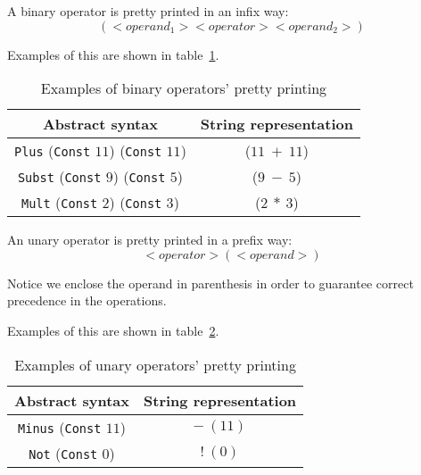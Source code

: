 A binary operator is pretty printed in an infix way:
\begin{equation*}
(<operand_1> <operator> <operand_2>)
\end{equation*}

Examples of this are shown in table~\ref{tab:pretty_bin_op}.

\begin{table}[h!]
\centering
\begin{tabular}{|c|c|}
  \hline
  \textbf{Abstract syntax} & \textbf{String representation} \\ [0.5ex]
  \hline \hline
  \verb|Plus| (\verb|Const| $11$) (\verb|Const| $11$) & ($11\ +\ 11$) \\
  \verb|Subst| (\verb|Const| $9$) (\verb|Const| $5$) & ($9\ -\ 5$) \\
  \verb|Mult| (\verb|Const| $2$) (\verb|Const| $3$) & ($2\ *\ 3$) \\
  \hline
\end{tabular}

\caption{Examples of binary operators' pretty printing}
\label{tab:pretty_bin_op}
\end{table}

An unary operator is pretty printed in a prefix way:
\begin{equation*}
<operator> (<operand>)
\end{equation*}

Notice we enclose the operand in parenthesis in order to guarantee correct precedence in the operations.

Examples of this are shown in table~\ref{tab:pretty_un_op}.

\begin{table}[h!]
\centering
\begin{tabular}{|c|c|}
  \hline
  \textbf{Abstract syntax} & \textbf{String representation} \\ [0.5ex]
  \hline \hline
  \verb|Minus| (\verb|Const| $11$) & $-\ (11)$ \\
  \verb|Not| (\verb|Const| $0$) & $!\ (0)$ \\
  \hline
\end{tabular}

\caption{Examples of unary operators' pretty printing}
\label{tab:pretty_un_op}
\end{table}



